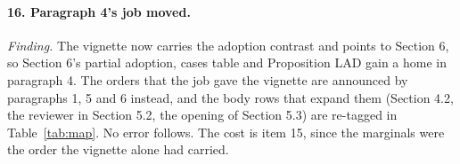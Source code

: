 \documentclass[11pt,a4paper]{article}
\begin{document}
\paragraph{16. Paragraph 4's job moved.}
\emph{Finding.} The vignette now carries the adoption contrast and points to Section 6, so
Section 6's partial adoption, cases table and Proposition LAD gain a home in paragraph 4. The
orders that the job gave the vignette are announced by paragraphs 1, 5 and 6 instead, and the
body rows that expand them (Section 4.2, the reviewer in Section 5.2, the opening of Section 5.3)
are re-tagged in Table~\ref{tab:map}. No error follows. The cost is item 15, since the marginals
were the order the vignette alone had carried.
\end{document}
